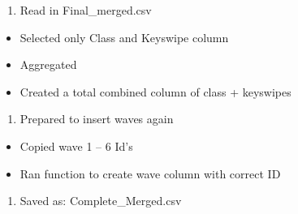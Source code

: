 \documentclass[
]{book}
\providecommand{\tightlist}{%
  \setlength{\itemsep}{0pt}\setlength{\parskip}{0pt}}
\begin{document}
\begin{enumerate}
\def\labelenumi{\alph{enumi}.}
\tightlist
\item
  Read in Final\_merged.csv
\end{enumerate}

\begin{itemize}
\tightlist
\item
  Selected only Class and Keyswipe column
\item
  Aggregated
\item
  Created a total combined column of class + keyswipes
\end{itemize}

\begin{enumerate}
\def\labelenumi{\alph{enumi}.}
\setcounter{enumi}{1}
\tightlist
\item
  Prepared to insert waves again
\end{enumerate}

\begin{itemize}
\tightlist
\item
  Copied wave 1 -- 6 Id's
\item
  Ran function to create wave column with correct ID
\end{itemize}

\begin{enumerate}
\def\labelenumi{\alph{enumi}.}
\setcounter{enumi}{2}
\tightlist
\item
  Saved as: Complete\_Merged.csv
\end{enumerate}
\end{document}
